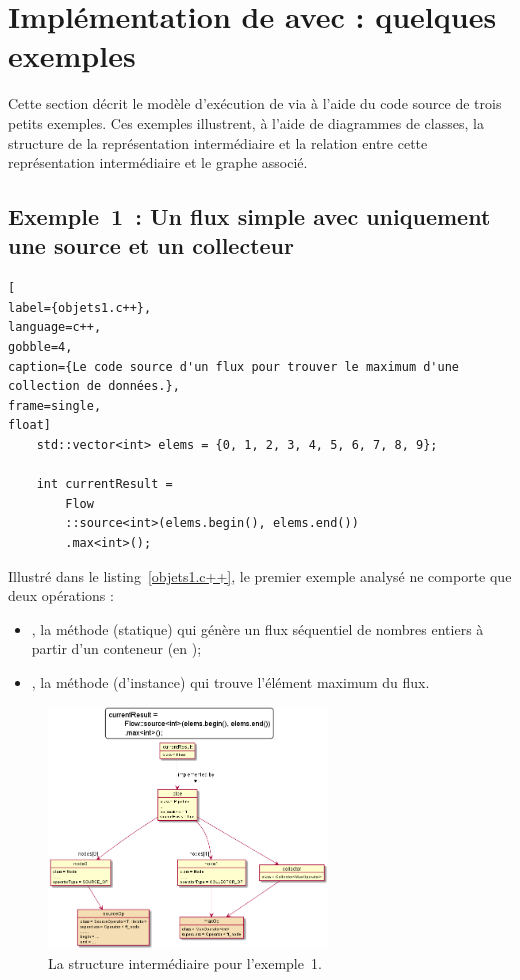 \section{Impl\'ementation de  avec  : quelques exemples}

Cette section d\'ecrit le mod\`ele d'ex\'ecution de  via  \`a l'aide du code source de trois petits exemples. Ces exemples illustrent, \`a l'aide de diagrammes de classes, la structure de la représentation intermédiaire et la relation entre cette représentation intermédiaire et le graphe  associé.


\subsection{Exemple~1~: Un flux simple avec uniquement une source et un collecteur} 


\begin{lstlisting}[
label={objets1.c++},
language=c++,
gobble=4,
caption={Le code source d'un flux pour trouver le maximum d'une collection de données.},
frame=single,
float]
    std::vector<int> elems = {0, 1, 2, 3, 4, 5, 6, 7, 8, 9};

    int currentResult =
        Flow
        ::source<int>(elems.begin(), elems.end())
        .max<int>();
\end{lstlisting}

Illustr\'e dans le listing~\ref{objets1.c++}, le premier exemple analys\'e ne comporte que deux op\'erations :

\begin{itemize}
\item {}, la méthode (statique) qui g\'en\`ere un flux s\'equentiel de nombres entiers \`a partir d'un conteneur (en ); 
\item {}, la méthode (d'instance) qui trouve l'\'el\'ement maximum du flux. 


\end{itemize}



\begin{figure}
\centering
         \includegraphics[width=0.66\textwidth]{Figures/objets1-ppff.png}
      \caption{La structure interm\'ediaire  pour l'exemple~1.}
       \label{objets1-ppff.fig}
\end{figure}


